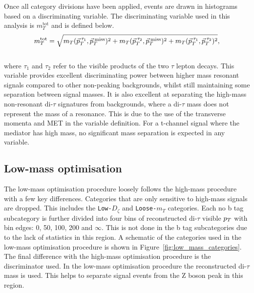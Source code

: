 Once all category divisions have been applied, events are drawn in histograms based on a discriminating variable.
The discriminating variable used in this analysis is $m_{T}^{\text{tot}}$ and is defined below. \\
\begin{equation}
m_{T}^\text{tot} = \sqrt{m_{T}(\vec{p}_{T}^{\hspace{2pt}\tau_1},\vec{p}_{T}^{\hspace{2pt}\text{miss}})^2 +  m_{T}(\vec{p}_{T}^{\hspace{2pt}\tau_2},\vec{p}_{T}^{\hspace{2pt}\text{miss}})^2 + m_{T}(\vec{p}_{T}^{\hspace{2pt}\tau_1},\vec{p}_{T}^{\hspace{2pt}\tau_2})^2},
\label{eqn:mt_tot}
\end{equation} \\
where $\tau_1$ and $\tau_2$ refer to the visible products of the two $\tau$ lepton decays.
This variable provides excellent discriminating power between higher mass resonant signals compared to other non-peaking backgrounds, whilst still maintaining some separation between signal masses.
It is also excellent at separating the high-mass non-resonant di-$\tau$ signatures from backgrounds, where a di-$\tau$ mass does not represent the mass of a resonance.
This is due to the use of the transverse momenta and MET in the variable definition.
For a t-channel signal where the mediator has high mass, no significant mass separation is expected in any variable. \\

\subsection{Low-mass optimisation}

The low-mass optimisation procedure loosely follows the high-mass procedure with a few key differences.
Categories that are only sensitive to high-mass signals are dropped.
This includes the \texttt{Low-$D_\zeta$} and \texttt{Loose-$m_{T}$} categories.
Each no b tag subcategory is further divided into four bins of reconstructed di-$\tau$ visible $p_{T}$ with bin edges: 0, 50, 100, 200 and $\infty$.
This is not done in the b tag subcategories due to the lack of statistics in this region.
A schematic of the categories used in the low-mass optimisation procedure is shown in Figure~\ref{fig:low_mass_categories}.
The final difference with the high-mass optimisation procedure is the discriminator used.
In the low-mass optimisation procedure the reconstructed di-$\tau$ mass is used.
This helps to separate signal events from the Z boson peak in this region. \\

